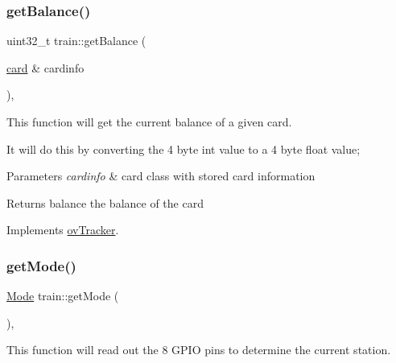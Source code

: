 \mbox{\label{classtrain_a518b32482f1a5a32cc372b6679644b43}} 
\subsubsection{\texorpdfstring{get\+Balance()}{getBalance()}}
{\footnotesize\ttfamily uint32\+\_\+t train\+::get\+Balance (\begin{DoxyParamCaption}\item[{\hyperlink{classcard}{card} \&}]{cardinfo }\end{DoxyParamCaption})\hspace{0.3cm}{\ttfamily [override]}, {\ttfamily [virtual]}}



This function will get the current balance of a given card. 

It will do this by converting the 4 byte int value to a 4 byte float value; 
\begin{DoxyParams}{Parameters}
{\em cardinfo} & card class with stored card information \\
\hline
\end{DoxyParams}
\begin{DoxyReturn}{Returns}
balance the balance of the card 
\end{DoxyReturn}


Implements \hyperlink{classovTracker_a9bcfc435593679ec503a48da21d7a5a0}{ov\+Tracker}.

\mbox{\label{classtrain_ae788938711f5940abc9ad9fa09a77011}} 
\subsubsection{\texorpdfstring{get\+Mode()}{getMode()}}
{\footnotesize\ttfamily \hyperlink{stations_8h_ad03936209251465257e0fdcfb33dbf91}{Mode} train\+::get\+Mode (\begin{DoxyParamCaption}{ }\end{DoxyParamCaption})\hspace{0.3cm}{\ttfamily [override]}, {\ttfamily [virtual]}}



This function will read out the 8 G\+P\+IO pins to determine the current station. 

